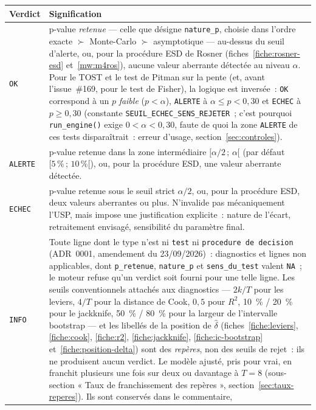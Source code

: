 \documentclass[a4paper,11pt]{article}
\newcommand{\code}[1]{\texttt{\small #1}}
\begin{document}
\begin{center}
\small
\begin{tabular}{@{}p{2.1cm}p{13.2cm}@{}}
\toprule
\textbf{Verdict} & \textbf{Signification} \\
\midrule
\code{OK} & p-value \emph{retenue} --- celle que désigne \code{nature\_p}, choisie dans l'ordre
exacte $\succ$ Monte-Carlo $\succ$ asymptotique --- au-dessus du seuil d'alerte, ou, pour la
procédure ESD de Rosner (fiches~\ref{fiche:rosner-esd} et~\ref{mw:m4ros}), aucune valeur
aberrante détectée au niveau $\alpha$. Pour le TOST et le test de Pitman sur la pente (et, avant
l'issue~\#169, pour le test de Fisher), la logique est inversée~: \code{OK} correspond à un $p$ \emph{faible} ($p < \alpha$),
\code{ALERTE} à $\alpha \le p < 0{,}30$ et \code{ECHEC} à $p \ge 0{,}30$ (constante
\code{SEUIL\_ECHEC\_SENS\_REJETER}~; c'est pourquoi \code{run\_engine()} exige
$0 < \alpha < 0{,}30$, faute de quoi la zone \code{ALERTE} de ces tests disparaîtrait~:
erreur d'usage, section~\ref{sec:controles}). \\
\code{ALERTE} & p-value retenue dans la zone intermédiaire $[\alpha/2\,;\,\alpha[$ (par défaut
$[5\,\%\,;\,10\,\%[$), ou, pour la procédure ESD, une valeur aberrante détectée. \\
\code{ECHEC} & p-value retenue sous le seuil strict $\alpha/2$, ou, pour la procédure ESD, deux
valeurs aberrantes ou plus. N'invalide pas
mécaniquement l'USP, mais impose une justification explicite~: nature de l'écart, retraitement
envisagé, sensibilité du paramètre final. \\
\code{INFO} & Toute ligne dont le type n'est ni \code{test} ni \code{procedure de decision}
(ADR~0001, amendement du 23/09/2026)~: diagnostics et lignes non applicables, dont
\code{p\_retenue}, \code{nature\_p} et \code{sens\_du\_test} valent \code{NA}~; le moteur refuse
qu'un verdict soit fourni pour une telle ligne. Les seuils conventionnels attachés aux
diagnostics --- $2k/T$ pour les leviers, $4/T$ pour la distance de Cook, $0{,}5$ pour $R^2$,
10~\% / 20~\% pour le
jackknife, 50~\% / 80~\% pour la largeur de l'intervalle bootstrap --- et les libellés de la
position de $\hat\delta$ (fiches~\ref{fiche:leviers}, \ref{fiche:cook}, \ref{fiche:r2},
\ref{fiche:jackknife}, \ref{fiche:ic-bootstrap}
et~\ref{fiche:position-delta}) sont des \emph{repères}, non des
seuils de rejet~: ils ne produisent aucun verdict. Le modèle ajusté, pris pour vrai, en franchit
plusieurs une fois sur deux ou davantage à $T = 8$ (sous-section « Taux de franchissement des
repères », section~\ref{sec:taux-reperes}). Ils sont conservés dans le commentaire,

\end{tabular}
\end{center}
\end{document}
